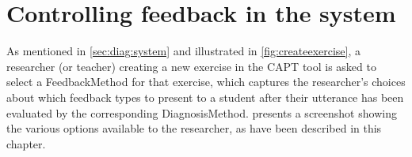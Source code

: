 %	
% 	
% 	
% 

%	
%	


\section{Controlling feedback in the system}
\label{sec:fb:system}

As mentioned in \cref{sec:diag:system} and illustrated in \cref{fig:createexercise}, a researcher (or teacher) creating a new exercise in the CAPT tool is asked to select a FeedbackMethod for that exercise, which captures the researcher's choices about which feedback types to present to a student after their utterance has been evaluated by the corresponding DiagnosisMethod.  presents a screenshot showing the various options available to the researcher, as have been described in this chapter.


